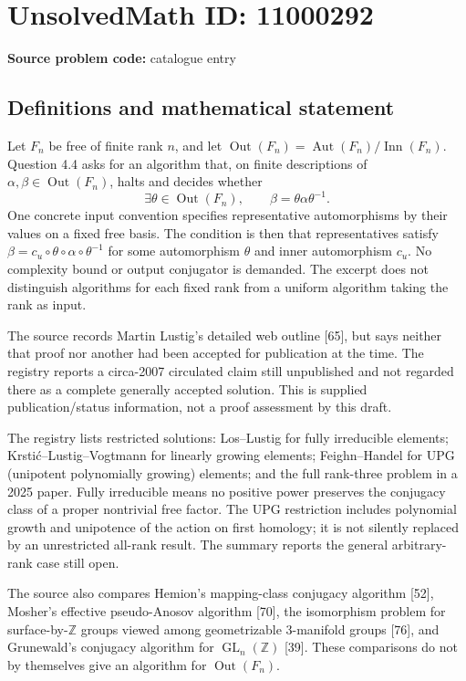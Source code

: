 \documentclass[11pt]{article}
\newcommand{\Z}{\mathbb{Z}}
\begin{document}
\section*{UnsolvedMath ID: 11000292}
\textbf{Source problem code:} catalogue entry
\subsection{Definitions and mathematical statement}
Let $F_n$ be free of finite rank $n$, and let $\operatorname{Out}(F_n)=\operatorname{Aut}(F_n)/\operatorname{Inn}(F_n)$. Question 4.4 asks for an algorithm that, on finite descriptions of $\alpha,\beta\in\operatorname{Out}(F_n)$, halts and decides whether
\[
 \exists\theta\in\operatorname{Out}(F_n),\qquad
 \beta=\theta\alpha\theta^{-1}.
\]
One concrete input convention specifies representative automorphisms by their values on a fixed free basis. The condition is then that representatives satisfy $\beta=c_u\circ\theta\circ\alpha\circ\theta^{-1}$ for some automorphism $\theta$ and inner automorphism $c_u$. No complexity bound or output conjugator is demanded. The excerpt does not distinguish algorithms for each fixed rank from a uniform algorithm taking the rank as input.

The source records Martin Lustig's detailed web outline [65], but says neither that proof nor another had been accepted for publication at the time. The registry reports a circa-2007 circulated claim still unpublished and not regarded there as a complete generally accepted solution. This is supplied publication/status information, not a proof assessment by this draft.

The registry lists restricted solutions: Los--Lustig for fully irreducible elements; Krsti\'c--Lustig--Vogtmann for linearly growing elements; Feighn--Handel for UPG (unipotent polynomially growing) elements; and the full rank-three problem in a 2025 paper. Fully irreducible means no positive power preserves the conjugacy class of a proper nontrivial free factor. The UPG restriction includes polynomial growth and unipotence of the action on first homology; it is not silently replaced by an unrestricted all-rank result. The summary reports the general arbitrary-rank case still open.

The source also compares Hemion's mapping-class conjugacy algorithm [52], Mosher's effective pseudo-Anosov algorithm [70], the isomorphism problem for surface-by-$\Z$ groups viewed among geometrizable $3$-manifold groups [76], and Grunewald's conjugacy algorithm for $\operatorname{GL}_n(\Z)$ [39]. These comparisons do not by themselves give an algorithm for $\operatorname{Out}(F_n)$.
\end{document}
